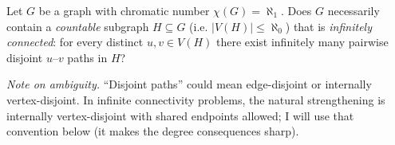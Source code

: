 Let $G$ be a graph with chromatic number $\chi(G)=\aleph_1$.
Does $G$ necessarily contain a \emph{countable} subgraph $H\subseteq G$ (i.e. $|V(H)|\le\aleph_0$) that is \emph{infinitely connected}:
for every distinct $u,v\in V(H)$ there exist infinitely many pairwise disjoint $u$--$v$ paths in $H$?

\emph{Note on ambiguity.} ``Disjoint paths'' could mean edge-disjoint or internally vertex-disjoint.  In infinite connectivity problems, the natural strengthening is internally vertex-disjoint with shared endpoints allowed; I will use that convention below (it makes the degree consequences sharp).
